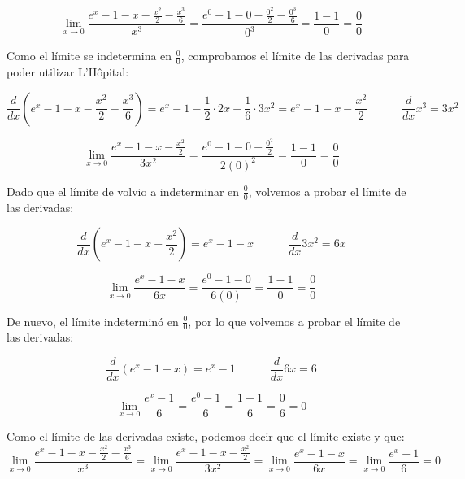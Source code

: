 \documentclass[12pt]{article}
\begin{document}
\begin{enumerate}[\hspace{9px} a)]
        \begin{equation*}
            \lim_{x \to 0}\frac{e^x-1-x-\frac{x^2}{2}-\frac{x^3}{6}}{x^3} = \frac{e^0-1-0-\frac{0^2}{2}-\frac{0^3}{6}}{0^3} = \frac{1-1}{0} = \frac{0}{0}
        \end{equation*}

        Como el l\'imite se indetermina en \(\displaystyle\frac{0}{0}\), comprobamos el l\'imite de las derivadas para poder utilizar L'H\^opital:

        \begin{equation*}
            \frac{d}{dx}\left(e^x-1-x-\frac{x^2}{2}-\frac{x^3}{6}\right) = e^x-1-\frac{1}{2}\cdot2x-\frac{1}{6}\cdot3x^2 = e^x-1-x-\frac{x^2}{2} \qquad \quad \frac{d}{dx}x^3=3x^2
        \end{equation*}

        \begin{equation*}
            \lim_{x \to 0}\frac{e^x-1-x-\frac{x^2}{2}}{3x^2} = \frac{e^0-1-0-\frac{0^2}{2}}{2(0)^2} = \frac{1-1}{0} = \frac{0}{0}
        \end{equation*}

        Dado que el l\'imite de volvio a indeterminar en \(\displaystyle\frac{0}{0}\), volvemos a probar el l\'imite de las derivadas:

        \begin{equation*}
            \frac{d}{dx}(e^x-1-x-\frac{x^2}{2}) = e^x-1-x \qquad \quad \frac{d}{dx}3x^2 = 6x
        \end{equation*}

        \begin{equation*}
            \lim_{x \to 0}\frac{e^x-1-x}{6x} = \frac{e^0-1-0}{6(0)} = \frac{1-1}{0} = \frac{0}{0}
        \end{equation*}

        De nuevo, el l\'imite indetermin\'o en \(\displaystyle\frac{0}{0}\), por lo que volvemos a probar el l\'imite de las derivadas:

        \begin{equation*}
            \frac{d}{dx}(e^x-1-x) = e^x-1 \qquad \quad \frac{d}{dx}6x = 6
        \end{equation*}

        \begin{equation*}
            \lim_{x \to 0}\frac{e^x-1}{6} = \frac{e^0-1}{6} = \frac{1-1}{6} = \frac{0}{6} = 0
        \end{equation*}

        Como el l\'imite de las derivadas existe, podemos decir que el l\'imite existe y que:
        \begin{equation*}
            \lim_{x \to 0}\frac{e^x-1-x-\frac{x^2}{2}-\frac{x^3}{6}}{x^3} =  \lim_{x \to 0}\frac{e^x-1-x-\frac{x^2}{2}}{3x^2} = \lim_{x \to 0}\frac{e^x-1-x}{6x} =  \lim_{x \to 0}\frac{e^x-1}{6} = 0
        \end{equation*}


\end{enumerate}
\end{document}
